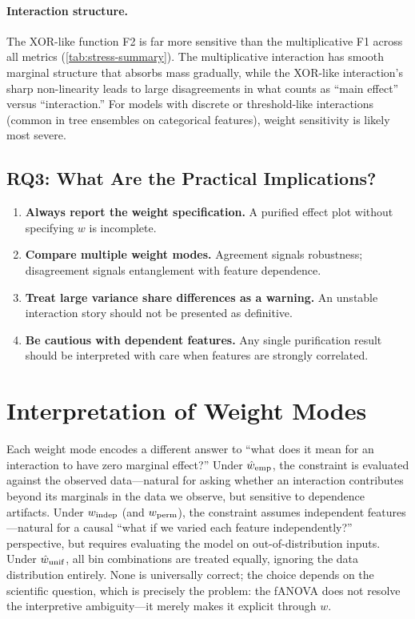 \paragraph{Interaction structure.}
The XOR-like function F2 is far more sensitive than the multiplicative F1 across all metrics (\cref{tab:stress-summary}).
The multiplicative interaction has smooth marginal structure that absorbs mass gradually, while the XOR-like interaction's sharp non-linearity leads to large disagreements in what counts as ``main effect'' versus ``interaction.''
For models with discrete or threshold-like interactions (common in tree ensembles on categorical features), weight sensitivity is likely most severe.

\subsection{RQ3: What Are the Practical Implications?}

\begin{enumerate}
    \item \textbf{Always report the weight specification.} A purified effect plot without specifying $w$ is incomplete.
    \item \textbf{Compare multiple weight modes.} Agreement signals robustness; disagreement signals entanglement with feature dependence.
    \item \textbf{Treat large variance share differences as a warning.} An unstable interaction story should not be presented as definitive.
    \item \textbf{Be cautious with dependent features.} Any single purification result should be interpreted with care when features are strongly correlated.
\end{enumerate}

\section{Interpretation of Weight Modes}

Each weight mode encodes a different answer to ``what does it mean for an interaction to have zero marginal effect?''
Under $\hat{w}_{\mathrm{emp}}$, the constraint is evaluated against the observed data---natural for asking whether an interaction contributes beyond its marginals in the data we observe, but sensitive to dependence artifacts.
Under $w_{\mathrm{indep}}$ (and $w_{\mathrm{perm}}$), the constraint assumes independent features---natural for a causal ``what if we varied each feature independently?'' perspective, but requires evaluating the model on out-of-distribution inputs.
Under $\hat{w}_{\mathrm{unif}}$, all bin combinations are treated equally, ignoring the data distribution entirely.
None is universally correct; the choice depends on the scientific question, which is precisely the problem: the fANOVA does not resolve the interpretive ambiguity---it merely makes it explicit through $w$.

